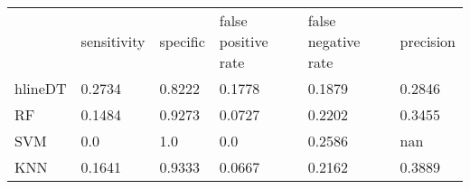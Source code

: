 \begin{table}[!h]
\begin{tabular}{l | l | l| l| l | l}
 & sensitivity & specific & false positive rate & false negative rate & precision \\hlineDT & 0.2734 & 0.8222 & 0.1778 & 0.1879 & 0.2846\\
RF & 0.1484 & 0.9273 & 0.0727 & 0.2202 & 0.3455\\
SVM & 0.0 & 1.0 & 0.0 & 0.2586 & nan\\
KNN & 0.1641 & 0.9333 & 0.0667 & 0.2162 & 0.3889\\
\end{tabular}
\caption{}
\end{table}

